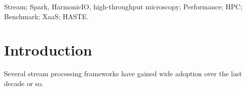 \documentclass[conference]{IEEEtran}
\begin{document}


\begin{IEEEkeywords}Stream; Spark, HarmonicIO, high-throughput microscopy; Performance; HPC; Benchmark; XaaS; HASTE.\end{IEEEkeywords}

\section{Introduction}\label{intro}




Several stream processing frameworks have gained wide adoption over the last decade or so.


\end{document}

